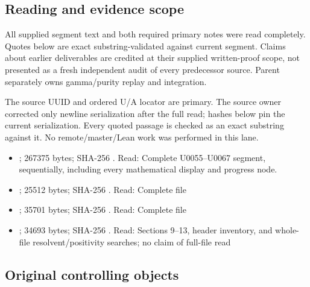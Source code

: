 \documentclass[10pt,a4paper,oneside]{report}
\providecommand{\tightlist}{\setlength{\itemsep}{0pt}\setlength{\parskip}{0pt}}
\begin{document}
\subsection{Reading and evidence
scope}\label{reading-and-evidence-scope}

All supplied segment text and both required primary notes were read
completely. Quotes below are exact substring-validated against current
segment. Claims about earlier deliverables are credited at their
supplied written-proof scope, not presented as a fresh independent audit
of every predecessor source. Parent separately owns gamma/purity replay
and integration.

The source UUID and ordered U/A locator are primary. The source owner
corrected only newline serialization after the full read; hashes below
pin the current serialization. Every quoted passage is checked as an
exact substring against it. No remote/master/Lean work was performed in
this lane.

\begin{itemize}
\tightlist
\item
  \protect{};
  267375 bytes; SHA-256
  \protect{}.
  Read: Complete U0055--U0067 segment, sequentially, including every
  mathematical display and progress node.
\item
  \protect{};
  25512 bytes; SHA-256
  \protect{}.
  Read: Complete file
\item
  \protect{};
  35701 bytes; SHA-256
  \protect{}.
  Read: Complete file
\item
  \protect{};
  34693 bytes; SHA-256
  \protect{}.
  Read: Sections 9--13, header inventory, and whole-file
  resolvent/positivity searches; no claim of full-file read
\end{itemize}

\subsection{Original controlling
objects}\label{original-controlling-objects}
\end{document}
